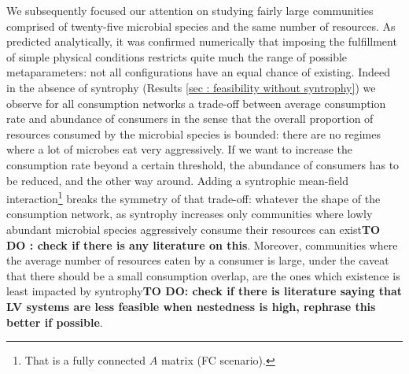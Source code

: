 \documentclass[12pt, titlepage]{report}
\begin{document}
We subsequently focused our attention on studying fairly large communities comprised of twenty-five microbial species and the same number of resources.
As predicted analytically, it was confirmed numerically that imposing the fulfillment of simple physical conditions restricts quite much the range of possible metaparameters: not all configurations have an equal chance of existing. Indeed in the absence of syntrophy (Results \ref{sec : feasibility without syntrophy}) we observe for all consumption networks a trade-off between average consumption rate and abundance of consumers in the sense that the overall proportion of resources consumed by the microbial species is bounded: there are no regimes where {a lot of microbes} eat very aggressively. If we want to increase the consumption rate beyond a certain threshold, the abundance of consumers has to be reduced, and the other way around. Adding a syntrophic mean-field interaction\footnote{That is a fully connected $A$ matrix (FC scenario).} breaks the symmetry of that trade-off: whatever the shape of the consumption network, as syntrophy increases only communities where lowly abundant microbial species aggressively consume their resources can exist\textbf{TO DO : check if there is any literature on this}. Moreover, communities where the average number of resources eaten by a consumer is large, under the caveat that there should be a small consumption overlap, are the ones which existence is least impacted by syntrophy\textbf{TO DO: check if there is literature saying that LV systems are less feasible when nestedness is high, rephrase this better if possible}.
\end{document}
